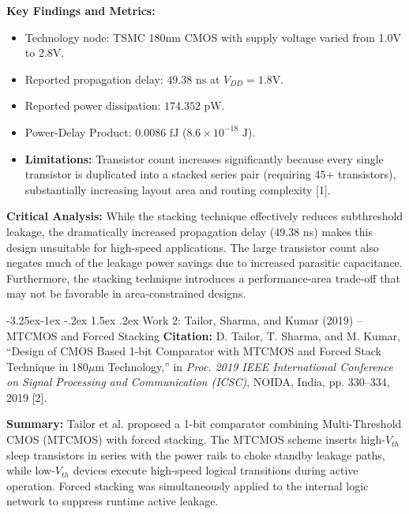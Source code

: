 \documentclass[12pt,a4paper,oneside]{report}
\makeatletter
\renewcommand\subsection{\@startsection{subsection}{2}{\z@}%
                                     {-3.25ex\@plus -1ex \@minus -.2ex}%
                                     {1.5ex \@plus .2ex}%
                                     {\normalfont\normalsize\bfseries\itshape}}
\makeatother
\begin{document}
\noindent\textbf{Key Findings and Metrics:}
\begin{itemize}
\item Technology node: TSMC 180nm CMOS with supply voltage varied from 1.0V to 2.8V.
\item Reported propagation delay: $49.38\text{ ns}$ at $V_{DD} = 1.8\text{V}$.
\item Reported power dissipation: $174.352\text{ pW}$.
\item Power-Delay Product: $0.0086\text{ fJ}$ ($8.6\times 10^{-18}\text{ J}$).
\item \textbf{Limitations:} Transistor count increases significantly because every single transistor is duplicated into a stacked series pair (requiring 45+ transistors), substantially increasing layout area and routing complexity [1].
\end{itemize}

\noindent\textbf{Critical Analysis:} While the stacking technique effectively reduces subthreshold leakage, the dramatically increased propagation delay (49.38 ns) makes this design unsuitable for high-speed applications. The large transistor count also negates much of the leakage power savings due to increased parasitic capacitance. Furthermore, the stacking technique introduces a performance-area trade-off that may not be favorable in area-constrained designs.

\subsection{Work 2: Tailor, Sharma, and Kumar (2019) -- MTCMOS and Forced Stacking}
\textbf{Citation:} D. Tailor, T. Sharma, and M. Kumar, ``Design of CMOS Based 1-bit Comparator with MTCMOS and Forced Stack Technique in 180$\mu$m Technology,'' in \textit{Proc. 2019 IEEE International Conference on Signal Processing and Communication (ICSC)}, NOIDA, India, pp. 330--334, 2019 [2].

\noindent\textbf{Summary:} Tailor et al. proposed a 1-bit comparator combining Multi-Threshold CMOS (MTCMOS) with forced stacking. The MTCMOS scheme inserts high-$V_{th}$ sleep transistors in series with the power rails to choke standby leakage paths, while low-$V_{th}$ devices execute high-speed logical transitions during active operation. Forced stacking was simultaneously applied to the internal logic network to suppress runtime active leakage.
\end{document}
